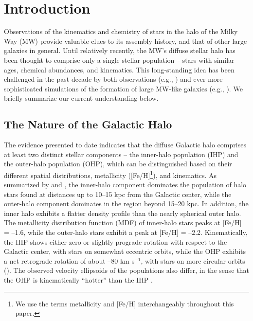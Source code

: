 \documentclass[iop]{emulateapj}
\newcommand*{\kms}{km s$^{-1}$}
\begin{document}

\section{Introduction}

Observations of the kinematics and chemistry of stars in the halo of the
Milky Way (MW) provide valuable clues to its assembly history, and that
of other large galaxies in general. Until relatively recently, the MW's
diffuse stellar halo has been thought to comprise only a single stellar
population -- stars with similar ages, chemical abundances, and
kinematics. This long-standing idea has been challenged in the past
decade by both observations (e.g., \citealt{carollo2007, carollo2010,
dejong2010, beers2012, an2013, an2015, hattori2013, allendeprieto2014,
chen2014, fernandez2015, fernandez2016a, fernandez2017, janesh2016, das2016}) and
ever more sophisticated simulations of the formation of large MW-like
galaxies (e.g., \citealt{zolotov2009, font2011, mccarthy2012,
tissera2013, tissera2014}). We briefly summarize our current
understanding below.

\subsection{The Nature of the Galactic Halo}

The evidence presented to date indicates that the diffuse Galactic halo
comprises at least two distinct stellar components -- the inner-halo
population (IHP) and the outer-halo population (OHP), which can be
distinguished based on their different spatial distributions,
metallicity ([Fe/H]\footnote[7]{We use the terms metallicity and [Fe/H]
interchangeably throughout this paper.}), and kinematics. As summarized
by \citet{carollo2010} and \citet{beers2012}, the inner-halo
component dominates the population of halo stars found at distances up
to 10--15 kpc from the Galactic center, while the outer-halo component
dominates in the region beyond 15--20 kpc. In addition, the inner halo
exhibits a flatter density profile than the nearly spherical outer halo.
The metallicity distribution function (MDF) of inner-halo
stars peaks at [Fe/H] = --1.6, while the outer-halo stars exhibit a peak
at [Fe/H] = --2.2. Kinematically, the IHP shows either zero or slightly
prograde rotation with respect to the Galactic center, with stars on
somewhat eccentric orbits, while the OHP exhibits a net retrograde
rotation of about --80 \kms, with stars on more circular orbits
(\citealt{carollo2007, carollo2010, kinman2012, hattori2013}). The observed 
velocity ellipsoids of the populations also differ, in the sense that
the OHP is kinematically ``hotter'' than the IHP \citep{carollo2007, carollo2010, 
carollo2014, an2015, helmi2017}.
\end{document}
